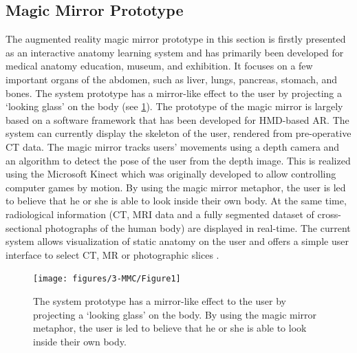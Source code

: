 \subsection{Magic Mirror Prototype}
The augmented reality magic mirror prototype in this section is firstly presented as an interactive anatomy learning system and has primarily been developed for medical anatomy education, museum, and exhibition. It focuses on a few important organs of the abdomen, such as liver, lungs, pancreas, stomach, and bones.  
The system prototype has a mirror-like effect to the user by projecting a `looking glass' on the body (see \figurename{\ref{fig:3-MMC:Prototype}}). The prototype of the magic mirror is largely based on a software framework that has been developed for HMD-based AR. The system can currently display the skeleton of the user, rendered from pre-operative CT data. The magic mirror tracks users' movements using a depth camera and an algorithm to detect the pose of the user from the depth image. This is realized using the Microsoft Kinect which was originally developed to allow controlling computer games by motion. By using the magic mirror metaphor, the user is led to believe that he or she is able to look inside their own body. At the same time, radiological information (CT, MRI data and a fully segmented dataset of cross-sectional photographs of the human body) are displayed in real-time. The current system allows visualization of static anatomy on the user and offers a simple user interface to select CT, MR or photographic slices \cite{Blum2012,Navab2012a}.
\begin{figure}
	\centering
	\texttt{[image: figures/3-MMC/Figure1]}
	\caption[The Magic Mirror]{The system prototype has a mirror-like effect to the user by projecting a `looking glass' on the body. By using the magic mirror metaphor, the user is led to believe that he or she is able to look inside their own body.}
	\label{fig:3-MMC:Prototype}
\end{figure}

